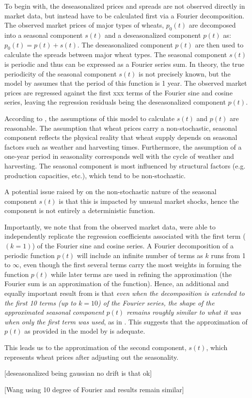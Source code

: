 \documentclass{article}
\begin{document}
	To begin with, the deseasonalized prices and spreads are not observed directly in market data, but instead have to be calculated first via a Fourier decomposition. The observed market prices of major types of wheats, $p_0(t)$ are decomposed into a seasonal component $s(t)$ and a deseasonalized component $p(t)$ as: $p_0(t) = p(t) + s(t)$. The deseasonalized component $p(t)$ are then used to calculate the spreads between major wheat types. The seasonal component $s(t)$ is periodic and thus can be expressed as a Fourier series sum. In theory, the true periodicity of the seasonal component $s(t)$ is not precisely known, but the model by \cite{ken93} assumes that the period of this function is 1 year. The observed market prices are regressed against the first xxx terms of the Fourier sine and cosine series, leaving the regression residuals being the deseasonalized component $p(t)$. 

	According to \cite{wang12}, the assumptions of this model to calculate $s(t)$ and $p(t)$ are reasonable. The assumption that wheat prices carry a non-stochastic, seasonal component reflects the physical reality that wheat supply depends on seasonal factors such as weather and harvesting times. Furthermore, the assumption of a one-year period in seasonality corresponds well with the cycle of weather and harvesting. The seasonal component is most influenced by structural factors (e.g. production capacities, etc.), which tend to be non-stochastic.

	A potential issue raised by \cite{wang12} on the non-stochastic nature of the seasonal component $s(t)$ is that this is impacted by unusual market shocks, hence the component is not entirely a deterministic function. 

	Importantly, we note that from the observed market data, \cite{wang12} were able to independently replicate the regression coefficients associated with the first term ($(k=1)$) of the Fourier sine and cosine series. A Fourier decomposition of a periodic function $p(t)$ will include an infinite number of terms as $k$ runs from 1 to $\infty$, even though the first several terms carry the most weights in forming the function $p(t)$ while later terms are used in refining the approximation (the Fourier sum is an approximation of the function). Hence, an additional and equally important result from \cite{wang12} is that \textit{even when the decomposition is extended to the first 10 terms (up to $k=10$) of the Fourier series, the shape of the approximated seasonal component $p(t)$ remains roughly similar to what it was when only the first term was used}, as in \cite{ken93}. This suggests that the approximation of $p(t)$ as provided in the model by \cite{ken93} is adequate.	

	This leads us to the approximation of the second component, $s(t)$, which represents wheat prices after adjusting out the seasonality. 

	[deseasonalized being gaussian no drift is that ok]
	
	[Wang using 10 degree of Fourier and results remain similar]



\end{document}
